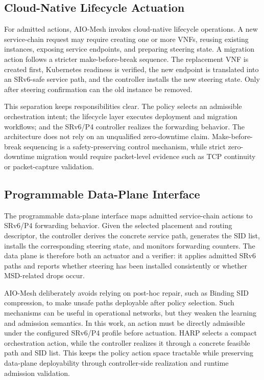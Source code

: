 \documentclass[final,5p]{elsarticle}
\begin{document}
\subsection{Cloud-Native Lifecycle Actuation}
\label{subsec:cloud_native_actuation}

For admitted actions, AIO-Mesh invokes cloud-native lifecycle operations. A new service-chain request may require creating one or more VNFs, reusing existing instances, exposing service endpoints, and preparing steering state. A migration action follows a stricter make-before-break sequence. The replacement VNF is created first, Kubernetes readiness is verified, the new endpoint is translated into an SRv6-safe service path, and the controller installs the new steering state. Only after steering confirmation can the old instance be removed.

This separation keeps responsibilities clear. The policy selects an admissible orchestration intent; the lifecycle layer executes deployment and migration workflows; and the SRv6/P4 controller realizes the forwarding behavior. The architecture does not rely on an unqualified zero-downtime claim. Make-before-break sequencing is a safety-preserving control mechanism, while strict zero-downtime migration would require packet-level evidence such as TCP continuity or packet-capture validation.

\subsection{Programmable Data-Plane Interface}
\label{subsec:data_plane_interface}

The programmable data-plane interface maps admitted service-chain actions to SRv6/P4 forwarding behavior. Given the selected placement and routing descriptor, the controller derives the concrete service path, generates the SID list, installs the corresponding steering state, and monitors forwarding counters. The data plane is therefore both an actuator and a verifier: it applies admitted SRv6 paths and reports whether steering has been installed consistently or whether MSD-related drops occur.

AIO-Mesh deliberately avoids relying on post-hoc repair, such as Binding SID compression, to make unsafe paths deployable after policy selection. Such mechanisms can be useful in operational networks, but they weaken the learning and admission semantics. In this work, an action must be directly admissible under the configured SRv6/P4 profile before actuation. HARP selects a compact orchestration action, while the controller realizes it through a concrete feasible path and SID list. This keeps the policy action space tractable while preserving data-plane deployability through controller-side realization and runtime admission validation.
\end{document}
